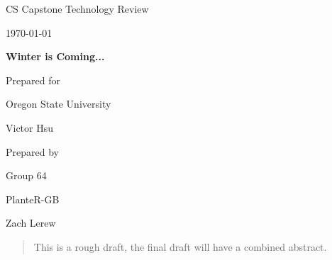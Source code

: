 \documentclass[onecolumn, draftclsnofoot,10pt, compsoc]{IEEEtran}
\def \CapstoneTeamName{			              			 PlanteR-GB}
\def \CapstoneTeamNumber{					           			 Group 64}
\def \GroupMemberOne{				           				Austin Hodgin}
\def \GroupMemberTwo{				           				Travis Hodgin}
\def \GroupMemberThree{			            Maximillian Schmidt}
\def \GroupMemberFour{		        	             Zach Lerew}
\def \CapstoneProjectName{	      	    Winter is Coming...}
\def \CapstoneSponsorCompany{		    Oregon State University}
\def \CapstoneSponsorPerson{		 			  				 Victor Hsu}
\def \DocType{		%
				Technology Review
				}
\newcommand{\NameSigPair}[1]{\par
\makebox[2.75in][r]{#1} \hfil 	\makebox[3.25in]{\makebox[2.25in]{\hrulefill} \hfill		\makebox[.75in]{\hrulefill}}
\par\vspace{-12pt} \textit{\tiny\noindent
\makebox[2.75in]{} \hfil		\makebox[3.25in]{\makebox[2.25in][r]{Signature} \hfill	\makebox[.75in][r]{Date}}}}
\renewcommand{\NameSigPair}[1]{#1}
\begin{document}
\begin{titlepage}
    \begin{singlespace}
        \hfill


        \par\vspace{.2in}
        \centering
        \scshape{
            \huge CS Capstone \DocType \par
            {\large\today}\par
            \vspace{.5in}
            \textbf{\Huge\CapstoneProjectName}\par

						\vspace{1in}

            {\large Prepared for}\par
            \Huge \CapstoneSponsorCompany\par
            \vspace{5pt}
            {\Large\NameSigPair{\CapstoneSponsorPerson}\par}

						\vspace{1in}

            {\large Prepared by}\par
						{\huge \CapstoneTeamNumber}\par
            \CapstoneTeamName\par
            \vspace{5pt}

            {
							\Large
							\NameSigPair{\GroupMemberFour}\par
            }

            \vspace{20pt}
        }

				\newpage
        \begin{abstract}
				\noindent This is a rough draft, the final draft will have a combined abstract.
        \end{abstract}
    \end{singlespace}
\end{titlepage}
\end{document}
